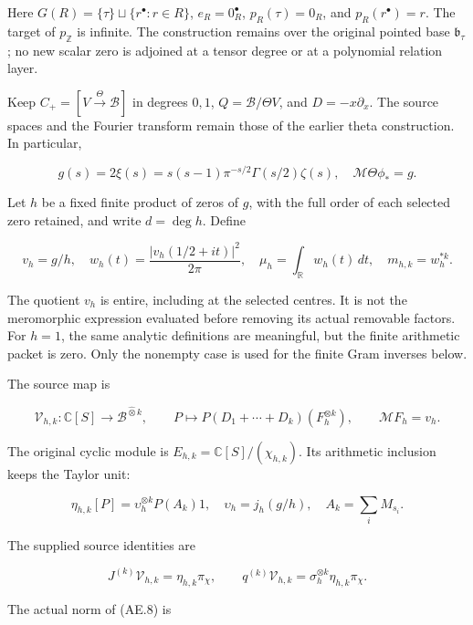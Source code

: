Here \(G(R)=\{\tau\}\sqcup\{r^\bullet:r\in R\}\), \(e_R=0_R^\bullet\),
\(p_R(\tau)=0_R\), and \(p_R(r^\bullet)=r\). The target of
\(p_{\mathbb Z}\) is infinite. The construction remains over the
original pointed base \(\mathfrak b_\tau\); no new scalar zero is
adjoined at a tensor degree or at a polynomial relation layer.

Keep \(C_+=[V\xrightarrow{\Theta}\mathscr B]\) in degrees \(0,1\),
\(Q=\mathscr B/\Theta V\), and \(D=-x\partial_x\). The source spaces and
the Fourier transform remain those of the earlier theta construction. In
particular,

\[
 g(s)=2\xi(s)=s(s-1)\pi^{-s/2}\Gamma(s/2)\zeta(s),\quad
 \mathcal M\Theta\phi_*=g.                                            \tag{AE.6}\label{AE.eq.6}
\]

Let \(h\) be a fixed finite product of zeros of \(g\), with the full
order of each selected zero retained, and write \(d=\deg h\). Define

\[
 v_h=g/h,\quad
 w_h(t)=\frac{|v_h(1/2+it)|^2}{2\pi},\quad
 \mu_h=\int_{\mathbb R}w_h(t)\,dt,\quad m_{h,k}=w_h^{*k}.               \tag{AE.7}\label{AE.eq.7}
\]

The quotient \(v_h\) is entire, including at the selected centres. It is
not the meromorphic expression evaluated before removing its actual
removable factors. For \(h=1\), the same analytic definitions are
meaningful, but the finite arithmetic packet is zero. Only the nonempty
case is used for the finite Gram inverses below.

The source map is

\[
 \mathcal V_{h,k}:\mathbb C[S]\longrightarrow\mathscr B^{\widehat\otimes k},
 \qquad P\longmapsto P(D_1+\cdots+D_k)(F_h^{\otimes k}),\qquad
 \mathcal MF_h=v_h.                                                    \tag{AE.8}\label{AE.eq.8}
\]

The original cyclic module is \(E_{h,k}=\mathbb C[S]/(\chi_{h,k})\). Its
arithmetic inclusion keeps the Taylor unit:

\[
 \eta_{h,k}[P]=\upsilon_h^{\otimes k}P(A_k)1,\quad
 \upsilon_h=j_h(g/h),\quad A_k=\sum_iM_{s_i}.                           \tag{AE.9}\label{AE.eq.9}
\]

The supplied source identities are

\[
 J^{(k)}\mathcal V_{h,k}=\eta_{h,k}\pi_\chi,\qquad
 q^{(k)}\mathcal V_{h,k}=\sigma_h^{\otimes k}\eta_{h,k}\pi_\chi.          \tag{AE.10}\label{AE.eq.10}
\]

The actual norm of (AE.8) is

